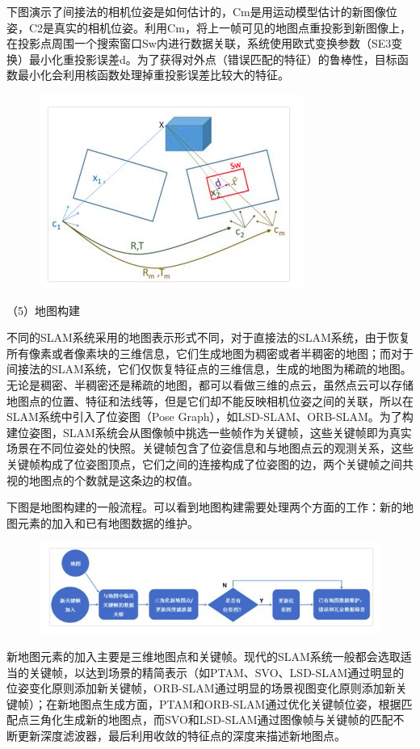 下图演示了间接法的相机位姿是如何估计的，Cm是用运动模型估计的新图像位姿，C2是真实的相机位姿。利用Cm，将上一帧可见的地图点重投影到新图像上，在投影点周围一个搜索窗口Sw内进行数据关联，系统使用欧式变换参数（SE3变换）最小化重投影误差d。为了获得对外点（错误匹配的特征）的鲁棒性，目标函数最小化会利用核函数处理掉重投影误差比较大的特征。
\begin{figure}[H]%
	\centering  %
	\includegraphics[width=0.7\linewidth]{image/Talk/20.png}  %

\end{figure}


（5）地图构建

不同的SLAM系统采用的地图表示形式不同，对于直接法的SLAM系统，由于恢复所有像素或者像素块的三维信息，它们生成地图为稠密或者半稠密的地图；而对于间接法的SLAM系统，它们仅恢复特征点的三维信息，生成的地图为稀疏的地图。无论是稠密、半稠密还是稀疏的地图，都可以看做三维的点云，虽然点云可以存储地图点的位置、特征和法线等，但是它们却不能反映相机位姿之间的关联，所以在SLAM系统中引入了位姿图（Pose Graph），如LSD-SLAM、ORB-SLAM。为了构建位姿图，SLAM系统会从图像帧中挑选一些帧作为关键帧，这些关键帧即为真实场景在不同位姿处的快照。关键帧包含了位姿信息和与地图点云的观测关系，这些关键帧构成了位姿图顶点，它们之间的连接构成了位姿图的边，两个关键帧之间共视的地图点的个数就是这条边的权值。

下图是地图构建的一般流程。可以看到地图构建需要处理两个方面的工作：新的地图元素的加入和已有地图数据的维护。
\begin{figure}[H]%
	\centering  %
	\includegraphics[width=0.7\linewidth]{image/Talk/21.png}  %

\end{figure}
新地图元素的加入主要是三维地图点和关键帧。现代的SLAM系统一般都会选取适当的关键帧，以达到场景的精简表示（如PTAM、SVO、LSD-SLAM通过明显的位姿变化原则添加新关键帧，ORB-SLAM通过明显的场景视图变化原则添加新关键帧）；在新地图点生成方面，PTAM和ORB-SLAM通过优化关键帧位姿，根据匹配点三角化生成新的地图点，而SVO和LSD-SLAM通过图像帧与关键帧的匹配不断更新深度滤波器，最后利用收敛的特征点的深度来描述新地图点。


